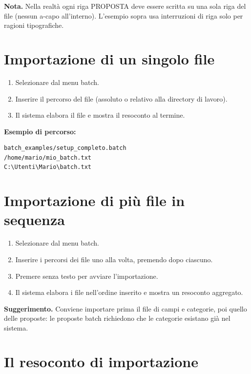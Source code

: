 \documentclass[12pt,a4paper,oneside]{report}
\newcommand{\tasto}[1]{\fbox{\small\ttfamily#1}}
\begin{document}
\begin{notabox}
\textbf{Nota.} Nella realtà ogni riga PROPOSTA deve essere scritta su una sola riga del file (nessun a-capo all'interno). L'esempio sopra usa interruzioni di riga solo per ragioni tipografiche.
\end{notabox}

\section{Importazione di un singolo file}

\begin{enumerate}
  \item Selezionare \tasto{s} dal menu batch.
  \item Inserire il percorso del file (assoluto o relativo alla directory di lavoro).
  \item Il sistema elabora il file e mostra il resoconto al termine.
\end{enumerate}

\textbf{Esempio di percorso:}
\begin{lstlisting}[style=bash]
batch_examples/setup_completo.batch
/home/mario/mio_batch.txt
C:\Utenti\Mario\batch.txt
\end{lstlisting}

\section{Importazione di più file in sequenza}

\begin{enumerate}
  \item Selezionare \tasto{m} dal menu batch.
  \item Inserire i percorsi dei file uno alla volta, premendo \tasto{INVIO} dopo ciascuno.
  \item Premere \tasto{INVIO} senza testo per avviare l'importazione.
  \item Il sistema elabora i file nell'ordine inserito e mostra un resoconto aggregato.
\end{enumerate}

\begin{notabox}
\textbf{Suggerimento.} Conviene importare prima il file di campi e categorie, poi quello delle proposte: le proposte batch richiedono che le categorie esistano già nel sistema.
\end{notabox}

\section{Il resoconto di importazione}
\end{document}
